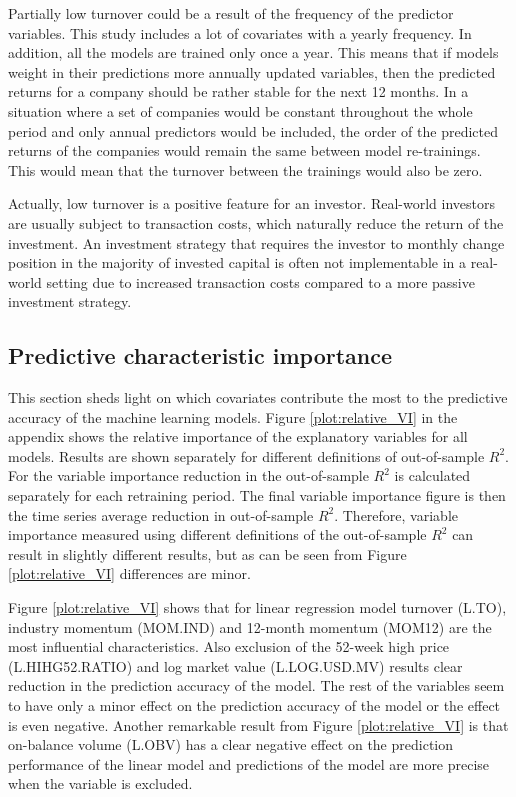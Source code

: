 \documentclass[12pt]{article}
\begin{document}
Partially low turnover could be a result of the frequency of the predictor variables. This study includes a lot of covariates with a yearly frequency. In addition, all the models are trained only once a year. This means that if models weight in their predictions more annually updated variables, then the predicted returns for a company should be rather stable for the next 12 months. In a situation where a set of companies would be constant throughout the whole period and only annual predictors would be included, the order of the predicted returns of the companies would remain the same between model re-trainings. This would mean that the turnover between the trainings would also be zero. \par

Actually, low turnover is a positive feature for an investor. Real-world investors are usually subject to transaction costs, which naturally reduce the return of the investment. An investment strategy that requires the investor to monthly change position in the majority of invested capital is often not implementable in a real-world setting due to increased transaction costs compared to a more passive investment strategy. \par

\subsection{Predictive characteristic importance}\label{PredictiveCharacteristicImportance}

This section sheds light on which covariates contribute the most to the predictive accuracy of the machine learning models. Figure \ref{plot:relative_VI} in the appendix shows the relative importance of the explanatory variables for all models. Results are shown separately for different definitions of out-of-sample $R^2$. For the variable importance reduction in the out-of-sample $R^2$ is calculated separately for each retraining period. The final variable importance figure is then the time series average reduction in out-of-sample $R^2$. Therefore, variable importance measured using different definitions of the out-of-sample $R^2$ can result in slightly different results, but as can be seen from Figure \ref{plot:relative_VI} differences are minor. \par

Figure \ref{plot:relative_VI} shows that for linear regression model turnover (L.TO), industry momentum (MOM.IND) and 12-month momentum (MOM12) are the most influential characteristics. Also exclusion of the 52-week high price (L.HIHG52.RATIO) and log market value (L.LOG.USD.MV) results clear reduction in the prediction accuracy of the model. The rest of the variables seem to have only a minor effect on the prediction accuracy of the model or the effect is even negative. Another remarkable result from Figure \ref{plot:relative_VI} is that on-balance volume (L.OBV) has a clear negative effect on the prediction performance of the linear model and predictions of the model are more precise when the variable is excluded. \par
\end{document}
